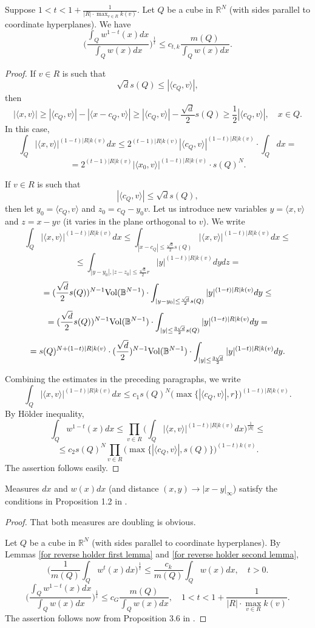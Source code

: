 \documentclass{amsart}
\numberwithin{equation}{section}
\begin{document}
\begin{lemma}\label{for reverse holder second lemma} Suppose $1<t<1+\frac1{|R|\cdot\max_{v\in R}k(v)}.$ Let $Q$ be a cube in $\mathbb{R}^N$ (with sides parallel to coordinate hyperplanes). We have
$$\Big(\frac{\int_Qw^{1-t}(x)dx}{\int_Qw(x)dx}\Big)^{\frac1t}\leq c_{t,k} \frac{m(Q)}{\int_Qw(x)dx}.$$
\end{lemma}
\begin{proof} If $v\in R$ is such that
$$\sqrt{d}s(Q)\leq |\langle c_Q,v\rangle|,$$
then
$$|\langle x,v\rangle|\geq |\langle c_Q,v\rangle|-|\langle x-c_Q,v\rangle|\geq |\langle c_Q,v\rangle|-\frac{\sqrt{d}}{2}s(Q)\geq \frac12|\langle c_Q,v\rangle|,\quad x\in Q.$$
In this case,
$$\int_Q|\langle x,v\rangle|^{(1-t)|R|k(v)}dx\leq 2^{(t-1)|R|k(v)}|\langle c_Q,v\rangle|^{(1-t)|R|k(v)}\cdot\int_Qdx=$$
$$=2^{(t-1)|R|k(v)}|\langle x_0,v\rangle|^{(1-t)|R|k(v)}\cdot s(Q)^N.$$

If $v\in R$ is such that
$$|\langle c_Q,v\rangle|\leq \sqrt{d}s(Q),$$
then let $y_0=\langle c_Q,v\rangle$ and $z_0=c_Q-y_0v.$ Let us introduce new variables $y=\langle x,v\rangle$ and $z=x-yv$ (it varies in the plane orthogonal to $v$). We write
$$\int_Q|\langle x,v\rangle|^{(1-t)|R|k(v)}dx\leq\int_{|x-c_Q|\leq\frac{\sqrt{d}}{2}s(Q)}|\langle x,v\rangle|^{(1-t)|R|k(v)}dx\leq$$
$$\leq \int_{|y-y_0|,|z-z_0|\leq \frac{\sqrt{d}}{2}r}|y|^{(1-t)|R|k(v)}dydz=$$
$$=(\frac{\sqrt{d}}{2}s(Q))^{N-1}{\rm Vol}(\mathbb{B}^{N-1})\cdot\int_{|y-y_0|\leq \frac{\sqrt{d}}{2}s(Q)}|y|^{(1-t)|R|k(v)}dy\leq$$
$$=(\frac{\sqrt{d}}{2}s(Q))^{N-1}{\rm Vol}(\mathbb{B}^{N-1})\cdot\int_{|y|\leq \frac{3\sqrt{d}}{2}s(Q)}|y|^{(1-t)|R|k(v)}dy=$$
$$=s(Q)^{N+(1-t)|R|k(v)}\cdot (\frac{\sqrt{d}}{2})^{N-1}{\rm Vol}(\mathbb{B}^{N-1})\cdot\int_{|y|\leq \frac{3\sqrt{d}}{2}}|y|^{(1-t)|R|k(v)}dy.$$

Combining the estimates in the preceding paragraphs, we write
$$\int_Q|\langle x,v\rangle|^{(1-t)|R|k(v)}dx\leq c_1s(Q)^N\big(\max\{|\langle c_Q,v\rangle|,r\}\big)^{(1-t)|R|k(v)}.$$
By H\"older inequality,
$$\int_Qw^{1-t}(x)dx\leq \prod_{v\in R}\Big(\int_Q|\langle x,v\rangle|^{(1-t)|R|k(v)}dx\Big)^{\frac1{|R|}}\leq$$
$$\leq c_2s(Q)^N\prod_{v\in R}\big(\max\{|\langle c_Q,v\rangle|,s(Q)\}\big)^{(1-t)k(v)}.$$
The assertion follows easily.
\end{proof}

\begin{lemma}\label{hytonen verification lemma} Measures $dx$ and $w(x)dx$ (and distance $(x,y)\to |x-y|_{\infty}$) satisfy the conditions in Proposition 1.2 in \cite{Hytonen-new}.
\end{lemma}
\begin{proof} That both measures are doubling is obvious.

Let $Q$ be a cube in $\mathbb{R}^N$ (with sides parallel to coordinate hyperplanes). By Lemmas \ref{for reverse holder first lemma} and \ref{for reverse holder second lemma},
$$\Big(\frac1{m(Q)}\int_Qw^t(x)dx\Big)^{\frac1t}\leq\frac{c_k}{m(Q)}\int_Qw(x)dx,\quad t>0.$$
$$\Big(\frac{\int_Qw^{1-t}(x)dx}{\int_Qw(x)dx}\Big)^{\frac1t}\leq c_G \frac{m(Q)}{\int_Qw(x)dx},\quad 1<t<1+\frac1{|R|\cdot\max_{v\in R}k(v)}.$$
The assertion follows now from Proposition 3.6 in \cite{Hytonen-new}.
\end{proof}
\end{document}
